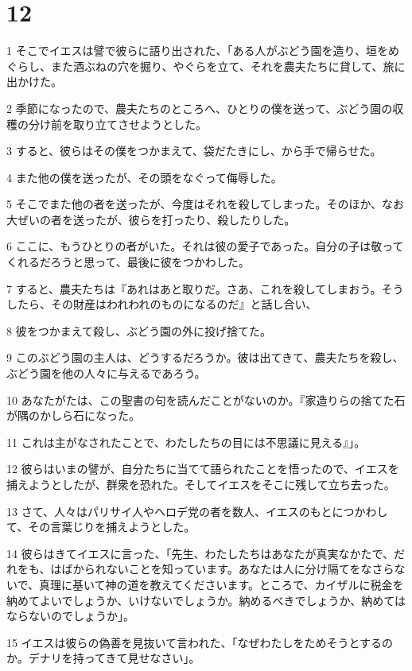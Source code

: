 \chapter{12}

\par 1 そこでイエスは譬で彼らに語り出された、「ある人がぶどう園を造り、垣をめぐらし、また酒ぶねの穴を掘り、やぐらを立て、それを農夫たちに貸して、旅に出かけた。
\par 2 季節になったので、農夫たちのところへ、ひとりの僕を送って、ぶどう園の収穫の分け前を取り立てさせようとした。
\par 3 すると、彼らはその僕をつかまえて、袋だたきにし、から手で帰らせた。
\par 4 また他の僕を送ったが、その頭をなぐって侮辱した。
\par 5 そこでまた他の者を送ったが、今度はそれを殺してしまった。そのほか、なお大ぜいの者を送ったが、彼らを打ったり、殺したりした。
\par 6 ここに、もうひとりの者がいた。それは彼の愛子であった。自分の子は敬ってくれるだろうと思って、最後に彼をつかわした。
\par 7 すると、農夫たちは『あれはあと取りだ。さあ、これを殺してしまおう。そうしたら、その財産はわれわれのものになるのだ』と話し合い、
\par 8 彼をつかまえて殺し、ぶどう園の外に投げ捨てた。
\par 9 このぶどう園の主人は、どうするだろうか。彼は出てきて、農夫たちを殺し、ぶどう園を他の人々に与えるであろう。
\par 10 あなたがたは、この聖書の句を読んだことがないのか。『家造りらの捨てた石が隅のかしら石になった。
\par 11 これは主がなされたことで、わたしたちの目には不思議に見える』」。
\par 12 彼らはいまの譬が、自分たちに当てて語られたことを悟ったので、イエスを捕えようとしたが、群衆を恐れた。そしてイエスをそこに残して立ち去った。
\par 13 さて、人々はパリサイ人やヘロデ党の者を数人、イエスのもとにつかわして、その言葉じりを捕えようとした。
\par 14 彼らはきてイエスに言った、「先生、わたしたちはあなたが真実なかたで、だれをも、はばかられないことを知っています。あなたは人に分け隔てをなさらないで、真理に基いて神の道を教えてくださいます。ところで、カイザルに税金を納めてよいでしょうか、いけないでしょうか。納めるべきでしょうか、納めてはならないのでしょうか」。
\par 15 イエスは彼らの偽善を見抜いて言われた、「なぜわたしをためそうとするのか。デナリを持ってきて見せなさい」。
